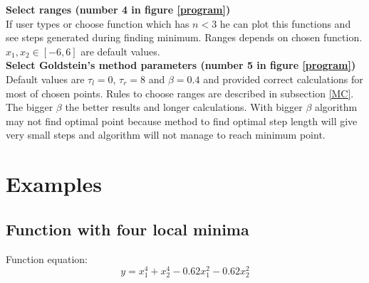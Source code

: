 \documentclass[12pt]{article}
\begin{document}
\textbf{Select ranges (number 4 in figure \ref{program})} \\
If user types or choose function which has $n < 3$ he can plot this functions and see steps generated during finding minimum. Ranges depends on chosen function. $x_1,x_2 \in [-6,6]$ are default values. \\

\textbf{Select Goldstein's method parameters (number 5 in figure \ref{program})}\\
Default values are $\tau_l=0$, $\tau_r=8$ and $\beta=0.4$ and provided correct calculations for most of chosen points. Rules to choose ranges are described in subsection \ref{MC}. The bigger $\beta$ the better results and longer calculations. With bigger $\beta$ algorithm may not find optimal point because method to find optimal step length will give very small steps and algorithm will not manage to reach minimum point.

\section{Examples}
\subsection{Function with four local minima}
Function equation:
\begin{equation}
y=x_1^4+x_2^4-0.62x_1^2-0.62x_2^2
\end{equation}
\end{document}
